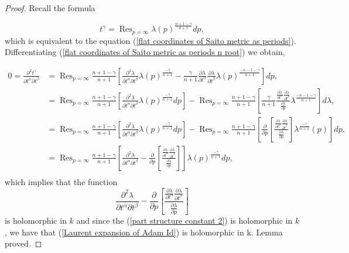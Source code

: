 \documentclass{article}
\theoremstyle{definition}
\DeclareMathOperator*{\res}{Res}
\begin{document}
\begin{proof}
Recall the formula

\begin{equation}\label{flat coordinates of Saito metric as periods n root}
t^{\gamma}=\res_{p=\infty} \lambda(p)^{\frac{n+1-\gamma}{n+1}} dp,
\end{equation}
which is equivalent to the equation (\ref{flat coordinates of Saito metric as periods}).
Differentiating (\ref{flat coordinates of Saito metric as periods n root}) we obtain,

\begin{equation}
\begin{split}
0=\frac{\partial ^2t^{\gamma}}{\partial t^{\alpha}\partial t^{\beta}}&=\res_{p=\infty} \frac{n+1-\gamma}{n+1}\left[ \frac{\partial ^2\lambda}{\partial t^{\alpha}\partial t^{\beta}} \lambda(p)^{\frac{-\gamma}{n+1}}-\frac{\gamma}{n+1}\frac{\partial \lambda}{\partial t^{\alpha}}\frac{\partial \lambda}{\partial t^{\beta}} \lambda(p)^{\frac{-n-1-\gamma}{n+1}}\right] dp,\\
&=\res_{p=\infty} \frac{n+1-\gamma}{n+1}\left[ \frac{\partial ^2\lambda}{\partial t^{\alpha}\partial t^{\beta}} \lambda(p)^{\frac{-\gamma}{n+1}}dp \right]-\res_{p=\infty} \frac{n+1-\gamma}{n+1}\left[ \frac{\gamma}{n+1}\frac{\frac{\partial \lambda}{\partial t^{\alpha}}\frac{\partial \lambda}{\partial t^{\beta}} }{\frac{\partial \lambda}{\partial p}}\lambda^{\frac{-n-1-\gamma}{n+1}}\right] d\lambda,\\
&=\res_{p=\infty} \frac{n+1-\gamma}{n+1}\left[ \frac{\partial ^2\lambda}{\partial t^{\alpha}\partial t^{\beta}} \lambda(p)^{\frac{-\gamma}{n+1}}dp \right]-\res_{p=\infty} \frac{n+1-\gamma}{n+1}\left[ \frac{\partial}{\partial p}\left[\frac{\frac{\partial \lambda}{\partial t^{\alpha}}\frac{\partial \lambda}{\partial t^{\beta}} }{\frac{\partial \lambda}{\partial p}}\right]\lambda^{\frac{-\gamma}{n+1}}(p)\right] dp,\\
&=\res_{p=\infty} \frac{n+1-\gamma}{n+1}\left[ \frac{\partial ^2\lambda}{\partial t^{\alpha}\partial t^{\beta}} - \frac{\partial}{\partial p}\left[\frac{\frac{\partial \lambda}{\partial t^{\alpha}}\frac{\partial \lambda}{\partial t^{\beta}} }{\frac{\partial \lambda}{\partial p}}\right]\right]\lambda(p)^{\frac{-\gamma}{n+1}} dp,\\
\end{split}
\end{equation}
which implies that the function 
\begin{equation*}
\frac{\partial ^2\lambda}{\partial t^{\alpha}\partial t^{\beta}} - \frac{\partial}{\partial p}\left[\frac{\frac{\partial \lambda}{\partial t^{\alpha}}\frac{\partial \lambda}{\partial t^{\beta}} }{\frac{\partial \lambda}{\partial p}}\right]
\end{equation*}
is holomorphic in $k$ and since the (\ref{part structure constant 2}) is holomorphic in $k$, we have that (\ref{Laurent expansion of Adam Id}) is holomorphic in k. Lemma proved.


\end{proof}
\end{document}
